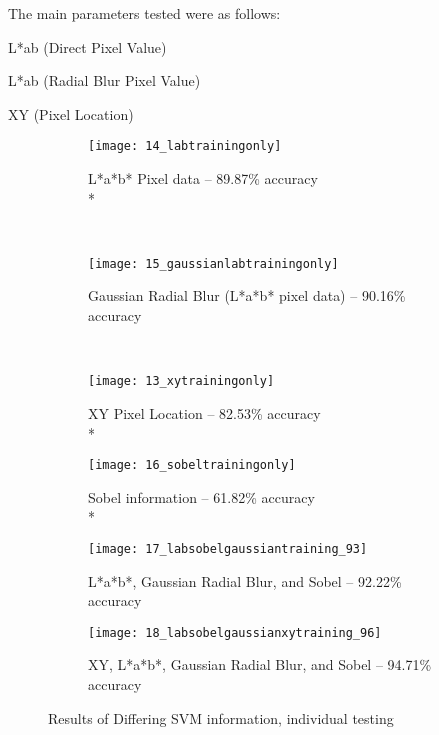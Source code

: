 The main parameters tested were as follows:
\begin{description}
  \item L*ab (Direct Pixel Value)
  \item L*ab (Radial Blur Pixel Value)
  \item XY (Pixel Location)
\end{description}
\begin{figure}
        \centering
        \begin{subfigure}[b]{0.3\textwidth}
                \centering
                \texttt{[image: 14\_labtrainingonly]}
                \caption{L*a*b* Pixel data -- 89.87\% accuracy \\*}
                \label{fig:14_labtrainingonly}
        \end{subfigure}%
        ~ %
        \begin{subfigure}[b]{0.3\textwidth}
                \centering
                \texttt{[image: 15\_gaussianlabtrainingonly]}
                \caption{Gaussian Radial Blur (L*a*b* pixel data) -- 90.16\% accuracy}
                \label{fig:15_gaussianlabtrainingonly}     
        \end{subfigure}
        ~ %
        \begin{subfigure}[b]{0.3\textwidth}
                \centering
                \texttt{[image: 13\_xytrainingonly]}
                \caption{XY Pixel Location -- 82.53\% accuracy \\*}
                \label{fig:13_xytrainingonly}
        \end{subfigure}
         \begin{subfigure}[b]{0.3\textwidth}
                \centering
                \texttt{[image: 16\_sobeltrainingonly]}
                \caption{Sobel information -- 61.82\% accuracy \\*}
                \label{fig:16_sobeltrainingonly}
        \end{subfigure}
        \begin{subfigure}[b]{0.3\textwidth}
                \centering
                \texttt{[image: 17\_labsobelgaussiantraining\_93]}
                \caption{L*a*b*, Gaussian Radial Blur, and Sobel -- 92.22\% accuracy}
                \label{fig:17_labsobelgaussiantraining_93}
        \end{subfigure}
        \begin{subfigure}[b]{0.3\textwidth}
                \centering
                \texttt{[image: 18\_labsobelgaussianxytraining\_96]}
                \caption{XY, L*a*b*, Gaussian Radial Blur, and Sobel -- 94.71\% accuracy}
                \label{fig:18_labsobelgaussianxytraining_96}
        \end{subfigure}
        \caption{Results of Differing SVM information, individual testing}\label{fig:labResults}
\end{figure}
